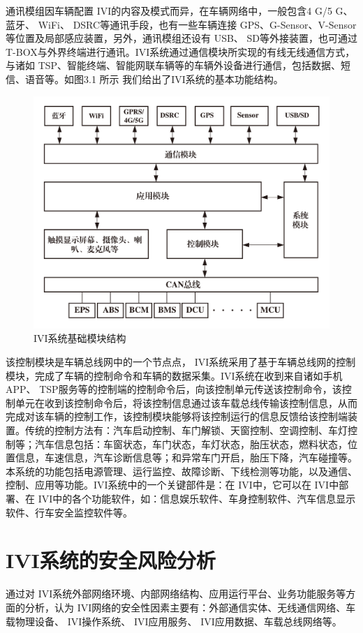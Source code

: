 通讯模组因车辆配置 IVI的内容及模式而异，在车辆网络中，一般包含4 G/5 G、蓝牙、 WiFi、 DSRC等通讯手段，也有一些车辆连接 GPS、G-Sensor、V-Sensor等位置及局部感应装置，另外，通讯模组还设有 USB、 SD等外接装置，也可通过T-BOX与外界终端进行通讯。IVI系统通过通信模块所实现的有线无线通信方式，与诸如 TSP、智能终端、智能网联车辆等的车辆外设备进行通信，包括数据、短信、语音等。如图3.1 所示 我们给出了IVI系统的基本功能结构。
\begin{figure}
  \centering
  \includegraphics[scale=0.4]{resources/img/a50.jpg}
  \caption{IVI系统基础模块结构}
\end{figure}
该控制模块是车辆总线网中的一个节点点， IVI系统采用了基于车辆总线网的控制模块，完成了车辆的控制命令和车辆的数据采集。IVI系统在收到来自诸如手机 APP、 TSP服务等的控制端的控制命令后，向该控制单元传送该控制命令，该控制单元在收到该控制命令后，将该控制信息通过该车载总线传输该控制信息，从而完成对该车辆的控制工作，该控制模块能够将该控制运行的信息反馈给该控制端装置。传统的控制方法有：汽车启动控制、车门解锁、天窗控制、空调控制、车灯控制等；汽车信息包括：车窗状态，车门状态，车灯状态，胎压状态，燃料状态，位置信息，车速信息，汽车诊断信息等；和异常车门开启，胎压下降，汽车碰撞等。
本系统的功能包括电源管理、运行监控、故障诊断、下线检测等功能，以及通信、控制、应用等功能。IVI系统中的一个关键部件是：在 IVI中，它可以在 IVI中部署、在 IVI中的各个功能软件，如：信息娱乐软件、车身控制软件、汽车信息显示软件、行车安全监控软件等。

\section{IVI系统的安全风险分析}
通过对 IVI系统外部网络环境、内部网络结构、应用运行平台、业务功能服务等方面的分析，认为 IVI网络的安全性因素主要有：外部通信实体、无线通信网络、车载物理设备、 IVI操作系统、 IVI应用服务、 IVI应用数据、车载总线网络等。

